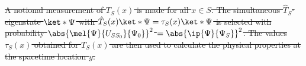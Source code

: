\documentclass[12pt]{report}
\providecommand{\DIFdel}[1]{{\protect\color{red}\sout{#1}}}                      %
\providecommand{\DIFdelFL}[1]{\DIFdel{#1}} %
\begin{document}



{%
\DIFdelFL{A notional measurement of $T_S(x)$ is made for all $x\in S$. The simultaneous  $\hat{T}_S$-eigenstate $\ket*{\Psi}$ with $\hat{T}_S(x)\ket*{\Psi}=\tau_S(x)\ket*{\Psi}$ is selected with probability $\abs{\mel{\Psi}{U_{SS_0}}{\Psi_0}}^2$ $=\abs{\ip{\Psi}{\Psi_S}}^2$. The values $\tau_S(x)$ obtained for $T_S(x)$ are then used to calculate the physical properties at the spacetime location $y$.  }}
\end{document}
